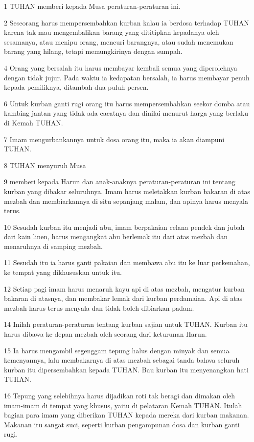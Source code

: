 \par 1 TUHAN memberi kepada Musa peraturan-peraturan ini.
\par 2 Seseorang harus mempersembahkan kurban kalau ia berdosa terhadap TUHAN karena tak mau mengembalikan barang yang dititipkan kepadanya oleh sesamanya, atau menipu orang, mencuri barangnya, atau sudah menemukan barang yang hilang, tetapi memungkirinya dengan sumpah.
\par 4 Orang yang bersalah itu harus membayar kembali semua yang diperolehnya dengan tidak jujur. Pada waktu ia kedapatan bersalah, ia harus membayar penuh kepada pemiliknya, ditambah dua puluh persen.
\par 6 Untuk kurban ganti rugi orang itu harus mempersembahkan seekor domba atau kambing jantan yang tidak ada cacatnya dan dinilai menurut harga yang berlaku di Kemah TUHAN.
\par 7 Imam mengurbankannya untuk dosa orang itu, maka ia akan diampuni TUHAN.
\par 8 TUHAN menyuruh Musa
\par 9 memberi kepada Harun dan anak-anaknya peraturan-peraturan ini tentang kurban yang dibakar seluruhnya. Imam harus meletakkan kurban bakaran di atas mezbah dan membiarkannya di situ sepanjang malam, dan apinya harus menyala terus.
\par 10 Sesudah kurban itu menjadi abu, imam berpakaian celana pendek dan jubah dari kain linen, harus mengangkat abu berlemak itu dari atas mezbah dan menaruhnya di samping mezbah.
\par 11 Sesudah itu ia harus ganti pakaian dan membawa abu itu ke luar perkemahan, ke tempat yang dikhususkan untuk itu.
\par 12 Setiap pagi imam harus menaruh kayu api di atas mezbah, mengatur kurban bakaran di atasnya, dan membakar lemak dari kurban perdamaian. Api di atas mezbah harus terus menyala dan tidak boleh dibiarkan padam.
\par 14 Inilah peraturan-peraturan tentang kurban sajian untuk TUHAN. Kurban itu harus dibawa ke depan mezbah oleh seorang dari keturunan Harun.
\par 15 Ia harus mengambil segenggam tepung halus dengan minyak dan semua kemenyannya, lalu membakarnya di atas mezbah sebagai tanda bahwa seluruh kurban itu dipersembahkan kepada TUHAN. Bau kurban itu menyenangkan hati TUHAN.
\par 16 Tepung yang selebihnya harus dijadikan roti tak beragi dan dimakan oleh imam-imam di tempat yang khusus, yaitu di pelataran Kemah TUHAN. Itulah bagian para imam yang diberikan TUHAN kepada mereka dari kurban makanan. Makanan itu sangat suci, seperti kurban pengampunan dosa dan kurban ganti rugi.
